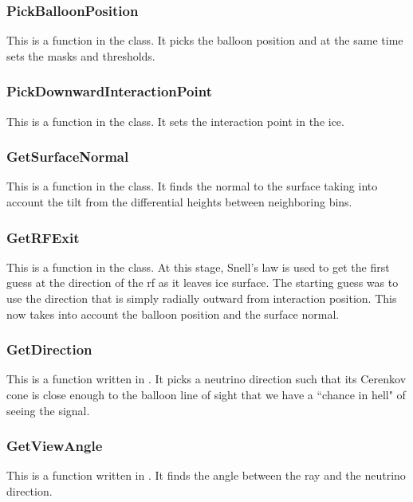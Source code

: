 \subsubsection{PickBalloonPosition}

This is a function in the  class. It picks the balloon position and at the same time sets the masks and thresholds. 

\subsubsection{PickDownwardInteractionPoint}

This is a function in the  class. 
It sets the interaction point in the ice. 

\subsubsection{GetSurfaceNormal}

This is a function in the  class. 
It finds the normal to the surface taking into account the tilt from the differential heights between neighboring bins. 

\subsubsection{GetRFExit}

This is a function in the  class. 
At this stage, Snell's law is used to get the first guess at the
direction of the \gls{rf} as it leaves ice surface.
The starting guess was to use the direction that is simply radially outward from interaction position. This now takes into account the balloon position and the surface normal.

\subsubsection{GetDirection}

This is a function written in . 
It picks a neutrino direction such that its Cerenkov cone is close enough to the balloon line of sight that we have a ``chance in hell" of seeing the signal.


\subsubsection{GetViewAngle}

This is a function written in . 
It finds the angle between the ray and the neutrino direction.


